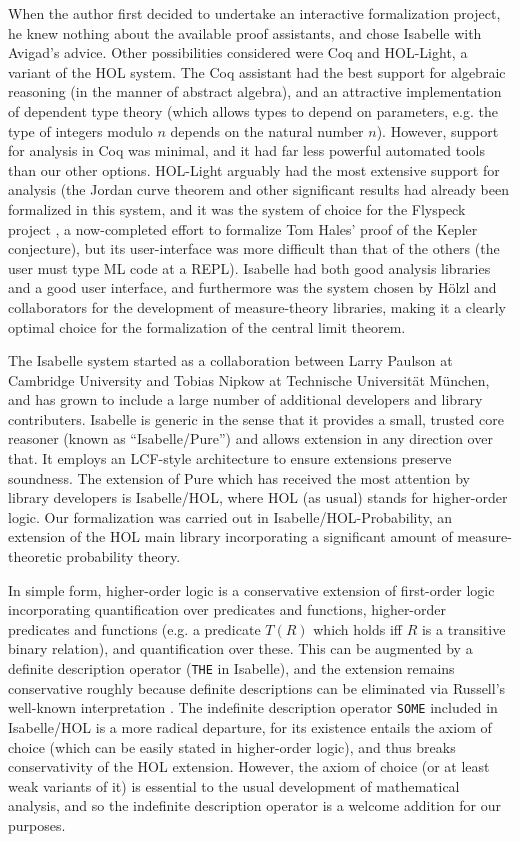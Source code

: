 \documentclass{article}
\theoremstyle{definition}
\begin{document}
When the author first decided to undertake an interactive formalization project, he knew nothing about the available proof assistants, and chose Isabelle with Avigad's advice. Other possibilities considered were Coq and HOL-Light, a variant of the HOL system. The Coq assistant \cite{coq-ref} had the best support for algebraic reasoning (in the manner of abstract algebra), and an attractive implementation of dependent type theory (which allows types to depend on parameters, e.g. the type of integers modulo $n$ depends on the natural number $n$). However, support for analysis in Coq was minimal, and it had far less powerful automated tools than our other options. HOL-Light \cite{harrison-hol-light} arguably had the most extensive support for analysis (the Jordan curve theorem \cite{hales-jordan} and other significant results had already been formalized in this system, and it was the system of choice for the Flyspeck project \cite{hales-kepler}, a now-completed effort to formalize Tom Hales' proof of the Kepler conjecture), but its user-interface was more difficult than that of the others (the user must type ML code at a REPL). Isabelle had both good analysis libraries and a good user interface, and furthermore was the system chosen by H\"olzl and collaborators for the development of measure-theory libraries, making it a clearly optimal choice for the formalization of the central limit theorem.

The Isabelle system started as a collaboration between Larry Paulson at Cambridge University and Tobias Nipkow at Technische Universit\"at M\"unchen, and has grown to include a large number of additional developers and library contributers. Isabelle is generic in the sense that it provides a small, trusted core reasoner (known as ``Isabelle/Pure'') and allows extension in any direction over that. It employs an LCF-style architecture \cite{gordon-lcf} to ensure extensions preserve soundness. The extension of Pure which has received the most attention by library developers is Isabelle/HOL, where HOL (as usual) stands for higher-order logic. Our formalization was carried out in Isabelle/HOL-Probability, an extension of the HOL main library incorporating a significant amount of measure-theoretic probability theory.

In simple form, higher-order logic is a conservative extension of first-order logic incorporating quantification over predicates and functions, higher-order predicates and functions (e.g. a predicate $T(R)$ which holds iff $R$ is a transitive binary relation), and quantification over these. This can be augmented by a definite description operator (\texttt{THE} in Isabelle), and the extension remains conservative roughly because definite descriptions can be eliminated via Russell's well-known interpretation \cite{russell-knowledge-acquaintance-description}. The indefinite description operator \texttt{SOME} included in Isabelle/HOL is a more radical departure, for its existence entails the axiom of choice (which can be easily stated in higher-order logic), and thus breaks conservativity of the HOL extension. However, the axiom of choice (or at least weak variants of it) is essential to the usual development of mathematical analysis, and so the indefinite description operator is a welcome addition for our purposes.
\end{document}
